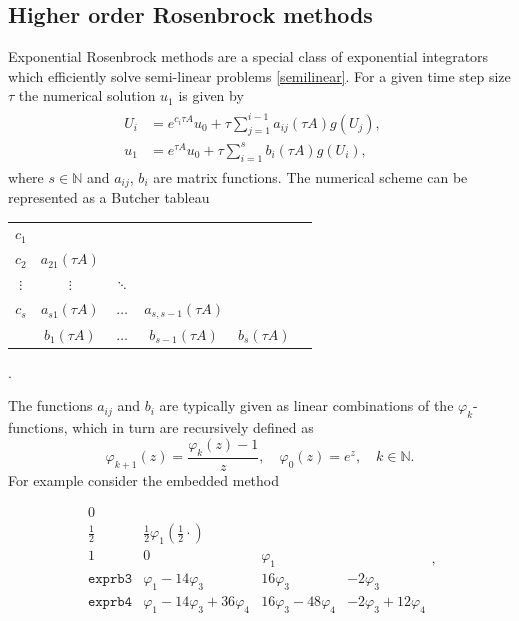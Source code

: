 \documentclass{scrartcl}
\begin{document}
	\subsection{Higher order Rosenbrock methods}
	Exponential Rosenbrock methods are a special class of exponential integrators which efficiently solve semi-linear problems \eqref{semilinear}. For a given time step size $\tau$ the numerical solution $u_1$ is given by
	\begin{align}
	\begin{split}
	U_{i} &= e^{c_i \tau A}u_0 + \tau\sum_{j=1}^{i-1}a_{ij}(\tau A)g(U_{j}), \quad \\
	u_{1} &= e^{    \tau A}u_0 + \tau\sum_{i=1}^{s}b_i(\tau A)g(U_{i}),
	\end{split}\label{exprbscheme}
	\end{align}
	where $s\in\mathbb{N}$ and $a_{ij}$, $b_{i}$ are matrix functions. The numerical scheme can be represented as a Butcher tableau
	\begin{table}[H]
		\centering
		\begin{tabular}{c|ccccc}
			$c_1$ &  &  &  & \\
			$c_2$ & $a_{21}(\tau A)$ &  &  & \\
			$\vdots$ & $\vdots$ &  $\ddots$  &  & \\
			$c_s$ & $a_{s1}(\tau A)$ & $\ldots$ & $a_{s,s-1}(\tau A)$  & \\
			\hline
			&$b_1(\tau A)$ & $\ldots$ & $b_{s-1}(\tau A)$ & $b_s(\tau A)$
		\end{tabular}
		.
	\end{table} \noindent The functions $a_{ij}$ and $b_{i}$ are typically given as linear combinations of the $\varphi_k$-functions, which in turn are recursively defined as 
	\[\varphi_{k+1}(z) = \frac{\varphi_k(z)-1}z, \quad \varphi_0(z) = e^z, \quad k\in\mathbb{N}.\]
	For example consider the embedded method
	\begin{table}[H]
		\vspace{-1em}
		\centering
		\renewcommand\arraystretch{1.2}
		\[
		\begin{array}
		{c|ccc}
		0\\
		\frac{1}{2} & \frac{1}{2}\varphi_1(\frac{1}{2}\cdot)\\
		1& 0& \varphi_1\\
		\hline
		\texttt{exprb3} & \varphi_1 - 14\varphi_3 & 16\varphi_3 & -2\varphi_3  \\
		\texttt{exprb4} & \varphi_1 - 14\varphi_3 + 36\varphi_4 & 16\varphi_3 -48\varphi_4 & -2\varphi_3 + 12\varphi_4 
		\end{array},
		\]
		\vspace{-2em}
	\end{table}
\end{document}
